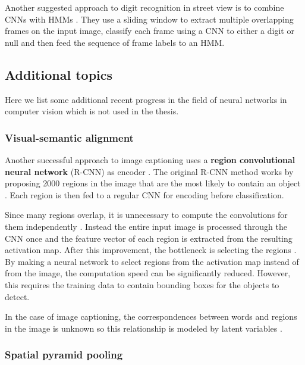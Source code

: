 Another suggested approach to digit recognition in street view is to combine CNNs with HMMs \cite{multidigit_streetview_CNN_HMM}. They use a sliding window to extract multiple overlapping frames on the input image, classify each frame using a CNN to either a digit or null and then feed the sequence of frame labels to an HMM.



\subsection{Additional topics}

Here we list some additional recent progress in the field of neural networks in computer vision which is not used in the thesis.

\subsubsection{Visual-semantic alignment}


Another successful approach to image captioning uses a \textbf{region convolutional neural network} (R-CNN) as encoder \cite{VisualSemanticAlignment}.
The original R-CNN method works by proposing 2000 regions in the image that are the most likely to contain an object \cite{RCNN}. Each region is then fed to a regular CNN for encoding before classification.

Since many regions overlap, it is unnecessary to compute the convolutions for them independently \cite{FastRCNN}. Instead the entire input image is processed through the CNN once and the feature vector of each region is extracted from the resulting activation map. After this improvement, the bottleneck is selecting the regions \cite{FasterRCNN}. By making a neural network to select regions from the activation map instead of from the image, the computation speed can be significantly reduced. However, this requires the training data to contain bounding boxes for the objects to detect.

In the case of image captioning, the correspondences between words and regions in the image is unknown so this relationship is modeled by latent variables \cite{VisualSemanticAlignment}.

\subsubsection{Spatial pyramid pooling}

